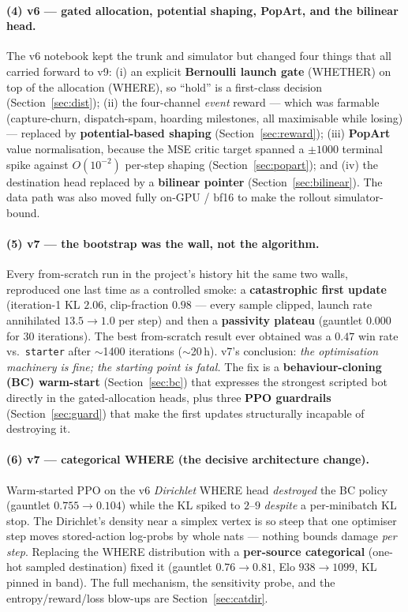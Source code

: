 \documentclass[11pt]{article}
\newcommand{\cd}[1]{\texttt{#1}}
\begin{document}
\paragraph{(4) v6 --- gated allocation, potential shaping, PopArt, and the bilinear head.}
The v6 notebook kept the trunk and simulator but changed four things that all carried forward to
v9: (i) an explicit \textbf{Bernoulli launch gate} (WHETHER) on top of the allocation (WHERE),
so ``hold'' is a first-class decision (Section~\ref{sec:dist}); (ii) the four-channel
\emph{event} reward --- which was farmable (capture-churn, dispatch-spam, hoarding milestones,
all maximisable while losing) --- replaced by \textbf{potential-based shaping}
(Section~\ref{sec:reward}); (iii) \textbf{PopArt} value normalisation, because the MSE critic
target spanned a $\pm1000$ terminal spike against $O(10^{-2})$ per-step shaping
(Section~\ref{sec:popart}); and (iv) the destination head replaced by a \textbf{bilinear
pointer} (Section~\ref{sec:bilinear}). The data path was also moved fully on-GPU / bf16 to make
the rollout simulator-bound.

\paragraph{(5) v7 --- the bootstrap was the wall, not the algorithm.} Every from-scratch run in
the project's history hit the same two walls, reproduced one last time as a controlled smoke: a
\textbf{catastrophic first update} (iteration-1 KL $2.06$, clip-fraction $0.98$ --- every sample
clipped, launch rate annihilated $13.5\!\to\!1.0$ per step) and then a \textbf{passivity
plateau} (gauntlet $0.000$ for 30 iterations). The best from-scratch result ever obtained was a
$0.47$ win rate vs.\ \cd{starter} after $\sim$1400 iterations ($\sim$20\,h). v7's conclusion:
\emph{the optimisation machinery is fine; the starting point is fatal.} The fix is a
\textbf{behaviour-cloning (BC) warm-start} (Section~\ref{sec:bc}) that expresses the strongest
scripted bot directly in the gated-allocation heads, plus three \textbf{PPO guardrails}
(Section~\ref{sec:guard}) that make the first updates structurally incapable of destroying it.

\paragraph{(6) v7 --- categorical WHERE (the decisive architecture change).} Warm-started PPO on
the v6 \emph{Dirichlet} WHERE head \emph{destroyed} the BC policy (gauntlet
$0.755\!\to\!0.104$) while the KL spiked to $2$--$9$ \emph{despite} a per-minibatch KL stop. The
Dirichlet's density near a simplex vertex is so steep that one optimiser step moves stored-action
log-probs by whole nats --- nothing bounds damage \emph{per step}. Replacing the WHERE
distribution with a \textbf{per-source categorical} (one-hot sampled destination) fixed it
(gauntlet $0.76\!\to\!0.81$, Elo $938\!\to\!1099$, KL pinned in band). The full mechanism, the
sensitivity probe, and the entropy/reward/loss blow-ups are Section~\ref{sec:catdir}.
\end{document}

